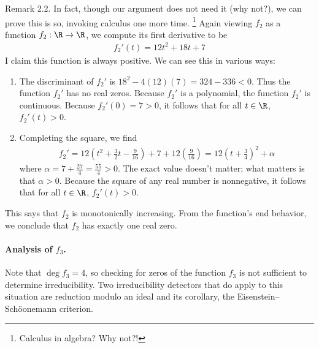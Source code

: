 {Remark 2.2. In fact, though our argument does not need it (why not?), we can prove this is so, invoking calculus one more time.%
\footnote{Calculus in algebra? Why not?!} %
Again viewing $f_{2}$ as a function $f_{2} : \R \rightarrow \R$, we compute its first derivative to be
\begin{align*}
f_{2}'(t)
=
12 t^{2} + 18 t + 7
\end{align*}
I claim this function is always positive. We can see this in various ways:
\begin{enumerate}
\item The discriminant of $f_{2}'$ is $18^{2} - 4 (12) (7) = 324 - 336 < 0$. Thus the function $f_{2}'$ has no real zeros. Because $f_{2}'$ is a polynomial, the function $f_{2}'$ is continuous. Because $f_{2}'(0) = 7 > 0$, it follows that for all $t \in \R$, $f_{2}'(t) > 0$.
\item Completing the square, we find
\begin{align*}
f_{2}'
=
12 \left(t^{2} + \frac{3}{2} t - \frac{9}{16}\right) + 7 + 12 \left(\frac{9}{16}\right)
=
12 \left(t + \frac{3}{4}\right)^{2} + \alpha
\end{align*}
where $\alpha = 7 + \frac{27}{4} = \frac{55}{4} > 0$. The exact value doesn't matter; what matters is that $\alpha > 0$. Because the square of any real number is nonnegative, it follows that for all $t \in \R$, $f_{2}'(t) > 0$.
\end{enumerate}
This says that $f_{2}$ is monotonically increasing. From the function's end behavior, we conclude that $f_{2}$ has exactly one real zero.

\paragraph{Analysis of $f_{3}$.}

Note that $\deg f_{3} = 4$, so checking for zeros of the function $f_{3}$ is not sufficient to determine irreducibility. Two irreducibility detectors that do apply to this situation are reduction modulo an ideal and its corollary, the Eisenstein--Sch\"{o}onemann criterion.

}

